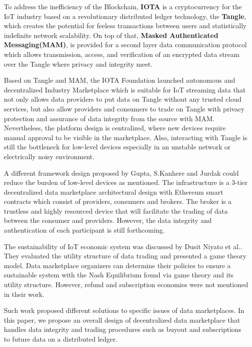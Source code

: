 \documentclass[journal,article,applsci,submit,moreauthors,pdftex]{Definitions/mdpi}
\begin{document}
To address the inefficiency of the Blockchain, \textbf{IOTA}\cite{IOTAwhitepaper} is a cryptocurrency for the IoT industry based on a revolutionary distributed ledger technology, the \textbf{Tangle}, which creates the potential for feeless transactions between users and statistically indefinite network scalability. On top of that, \textbf{Masked Authenticated Messaging(MAM)}\cite{MAM}\cite{MAMSpec}\cite{MAMDescription}, is provided for a second layer data communication protocol which allows transmission, access, and verification of an encrypted data stream over the Tangle where privacy and integrity meet.

Based on Tangle and MAM, the IOTA Foundation launched autonomous and decentralized Industry Marketplace\cite{IOTAIdustryMarketplace} which is suitable for IoT streaming data that not only allows data providers to put data on Tangle without any trusted cloud services, but also allow providers and consumers to trade on Tangle with privacy protection and assurance of data integrity from the source with MAM. Nevertheless, the platform design is centralized, where new devices require manual approval to be visible in the marketplace. Also, interacting with Tangle is still the bottleneck for low-level devices especially in an unstable network or electrically noisy environment.

A different framework design proposed by Gupta, S.Kanhere and Jurdak\cite{3tierDataMarket} could reduce the burden of low-level devices as mentioned. The infrastructure is a 3-tier decentralized data marketplace architectural design with Ethereum smart contracts which consist of providers, consumers and brokers. The broker is a trustless and highly resourced device that will facilitate the trading of data between the consumer and providers. However, the data integrity and authentication of each participant is still forthcoming.

The sustainability of IoT economic system was discussed by Dusit Niyato et al.\cite{UtilityStruct}. They evaluated the utility structure of data trading and presented a game theory model.  Data marketplace organizers can determine their policies to ensure a sustainable system with the Nash Equilibrium found via game theory and its utility structure. However, refund and subscription economies were not mentioned in their work.

Such work proposed different solutions to specific issues of data marketplaces. In this paper, we propose an overall design of decentralized data marketplace that handles data integrity and trading procedures such as buyout and subscriptions to future data on a distributed ledger.
\end{document}
